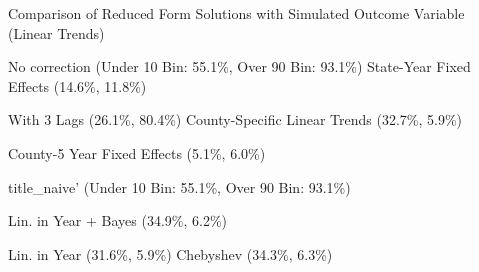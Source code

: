 \caption{Comparison of Reduced Form Solutions with Simulated Outcome Variable (Linear Trends) \label{fig:distributions-existing-solutions}}
\caption*{\color{p1line}{\textbf{\textemdash\textemdash}} No correction (Under 10 Bin: 55.1\%, Over 90 Bin: 93.1\%) \hspace{1cm} \color{p2line}{- - -} State-Year Fixed Effects (14.6\%, 11.8\%)}
\caption*{\color{p3line}{\textbf{- - -}} With 3 Lags (26.1\%, 80.4\%) \hspace{1cm} \color{p4line}{\textbf{- - -}} County-Specific Linear Trends (32.7\%, 5.9\%)}
\caption*{\color{p5line}{\textbf{- - -}} County-5 Year Fixed Effects (5.1\%, 6.0\%)}


\caption*{\color{p1line}{\textbf{\textemdash\textemdash}} title_naive' (Under 10 Bin: 55.1\%, Over 90 Bin: 93.1\%)}
\caption*{\color{p2line}{\textbf{- - -}} Lin. in Year + Bayes (34.9\%, 6.2\%)}
\caption*{\color{p3line}{\textbf{- - -}} Lin. in Year (31.6\%, 5.9\%) \hspace{1cm} \color{p4line}{\textbf{- - -}} Chebyshev (34.3\%, 6.3\%)}